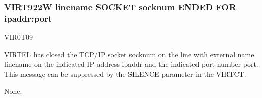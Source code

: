 \documentclass[letterpaper,10pt,english]{sphinxmanual}
\begin{document}
\subsubsection{VIRT922W linename SOCKET socknum ENDED FOR ipaddr:port}
\label{\detokenize{messages:virt922w-linename-socket-socknum-ended-for-ipaddr-port}}\begin{description}
\sphinxAtStartPar
VIR0T09

\sphinxAtStartPar
VIRTEL has closed the TCP/IP socket socknum on the line with external name linename on the indicated IP address ipaddr and the indicated port number port. This message can be suppressed by the SILENCE parameter in the VIRTCT.

\sphinxAtStartPar
None.

\end{description}
\end{document}

